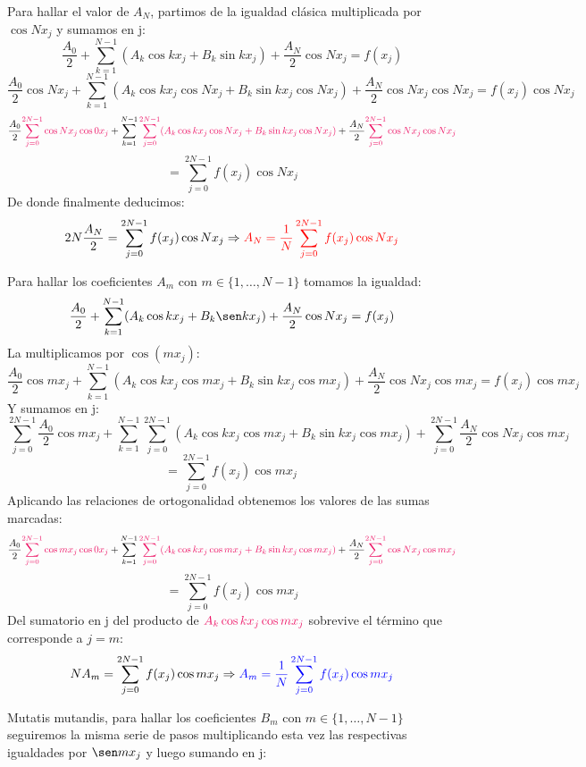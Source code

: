 \documentclass{article}
\begin{document}
\noindent Para hallar el valor de $A_N$, partimos de la igualdad clásica multiplicada por $\cos N x_j$ y sumamos en j:
$$
\frac{A_0}{2} + \sum_{k=1}^{N-1} (A_k \cos k x_j + B_k \sin k x_j) + \frac{A_N}{2}\cos N x_j = f(x_j)
$$
$$
\frac{A_0}{2}\cos N x_j + \sum_{k=1}^{N-1} (A_k \cos k x_j \cos N x_j + B_k \sin k x_j \cos N x_j) + \frac{A_N}{2}\cos N x_j \cos N x_j = f(x_j)\cos N x_j
$$
$$
\frac{A_0}{2} \textcolor{WildStrawberry}{\sum_{j=0}^{2N-1} \cos N x_j \cos 0 x_j} + \sum_{k=1}^{N-1} \textcolor{WildStrawberry}{\sum_{j=0}^{2N-1}(A_k \cos k x_j \cos N x_j + B_k \sin k x_j \cos N x_j)} + \frac{A_N}{2} \textcolor{WildStrawberry}{\sum_{j=0}^{2N-1} \cos N x_j \cos N x_j}
$$
$$
=\sum_{j=0}^{2N-1} f(x_j)\cos N x_j
$$
De donde finalmente deducimos:
$$
2N \frac{A_N}{2}  = \sum_{j=0}^{2N-1} f(x_j)\cos N x_j \Rightarrow \textcolor{red}{A_N = \frac{1}{N} \sum_{j=0}^{2N-1} f(x_j)\cos N x_j}
$$

\noindent Para hallar los coeficientes $A_m$ con $m\in \{1,\hdots,N-1\}$ tomamos la igualdad:
$$
\frac{A_0}{2} + \sum_{k=1}^{N-1} (A_k \cos k x_j + B_k \sen k x_j) + \frac{A_N}{2} \cos N x_j = f(x_j)
$$
La multiplicamos por $\cos(m x_j)$:
$$
\frac{A_0}{2}\cos m x_j + \sum_{k=1}^{N-1} (A_k \cos k x_j \cos m x_j + B_k \sin k x_j \cos m x_j) + \frac{A_N}{2}\cos N x_j \cos m x_j = f(x_j)\cos m x_j
$$
Y sumamos en j:
$$
\sum_{j=0}^{2N-1} \frac{A_0}{2}\cos m x_j + \sum_{k=1}^{N-1} \sum_{j=0}^{2N-1}(A_k \cos k x_j \cos m x_j + B_k \sin k x_j \cos m x_j) + \sum_{j=0}^{2N-1} \frac{A_N}{2}\cos N x_j \cos m x_j
$$
$$
= \sum_{j=0}^{2N-1} f(x_j)\cos m x_j\
$$
Aplicando las relaciones de ortogonalidad obtenemos los valores de las sumas marcadas:
$$
\frac{A_0}{2} \textcolor{WildStrawberry}{ \sum_{j=0}^{2N-1} \cos m x_j \cos 0 x_j } + \sum_{k=1}^{N-1} \textcolor{WildStrawberry}{ \sum_{j=0}^{2N-1}(A_k \cos k x_j \cos m x_j + B_k \sin k x_j \cos m x_j ) } + \frac{A_N}{2} \textcolor{WildStrawberry}{ \sum_{j=0}^{2N-1}\cos N x_j \cos m x_j }
$$
$$
= \sum_{j=0}^{2N-1} f(x_j)\cos m x_j
$$
Del sumatorio en j del producto de $\textcolor{WildStrawberry}{A_k \cos k x_j \cos m x_j}$ sobrevive el término que corresponde a $j=m$:
$$
N A_m  = \sum_{j=0}^{2N-1} f(x_j)\cos m x_j \Rightarrow \textcolor{blue}{A_m = \frac{1}{N} \sum_{j=0}^{2N-1} f(x_j)\cos m x_j}
$$

\noindent Mutatis mutandis, para hallar los coeficientes $B_m$ con $m\in \{1,\hdots,N-1\}$ seguiremos la misma serie de pasos multiplicando esta vez las respectivas igualdades por $\sen m x_j$ y luego sumando en j:
\end{document}
